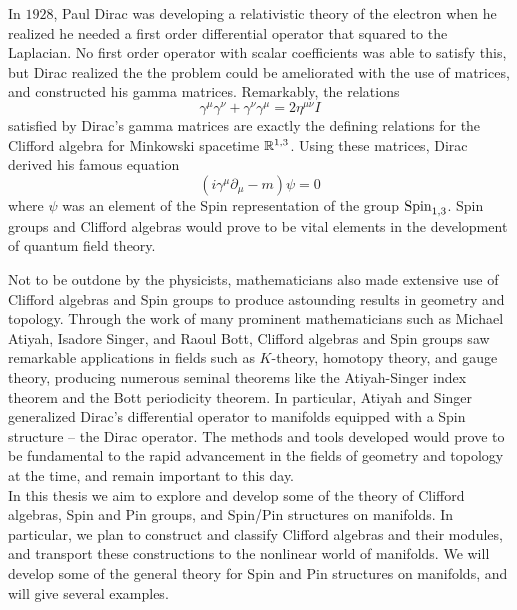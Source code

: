 In $1928$, Paul Dirac was developing a relativistic theory of the electron
when he realized he needed a first order differential operator that squared
to the Laplacian. No first order operator with scalar coefficients was able
to satisfy this, but Dirac realized the the problem could be ameliorated with
the use of matrices, and constructed his gamma matrices. Remarkably, the
relations
\[
\gamma^\mu\gamma^\nu + \gamma^\nu\gamma^\mu = 2\eta^{\mu\nu}I
\]
satisfied by Dirac's gamma matrices are exactly the defining relations for the
Clifford algebra for Minkowski spacetime $\mathbb{R}^{1,3}$. Using these matrices, Dirac
derived his famous equation
\[
(i\gamma^\mu\partial_\mu -m)\psi = 0
\]
where $\psi$ was an element of the Spin representation of the group $\mathrm{Spin}_{1,3}$.
Spin groups and Clifford algebras would prove to be vital elements in the development
of quantum field theory.

Not to be outdone by the physicists, mathematicians also made extensive use
of Clifford algebras and Spin groups to produce astounding results in geometry
and topology. Through the work of many prominent mathematicians such as Michael
Atiyah, Isadore Singer, and Raoul Bott, Clifford algebras and Spin groups saw
remarkable applications in fields such as $K$-theory, homotopy theory, and
gauge theory, producing numerous seminal theorems like the Atiyah-Singer index
theorem and the Bott periodicity theorem. In particular, Atiyah and Singer
generalized Dirac's differential operator to manifolds equipped with a Spin
structure -- the Dirac operator. The methods and tools developed would prove
to be fundamental to the rapid advancement in the fields of geometry and topology
at the time, and remain important to this day. \\

In this thesis we aim to explore and develop some of the theory of
Clifford algebras, Spin and Pin groups, and Spin/Pin structures on manifolds.
In particular, we plan to construct and classify Clifford algebras and their
modules, and transport these constructions to the nonlinear world of manifolds.
We will develop some of the general theory for Spin and Pin structures on manifolds,
and will give several examples.
%